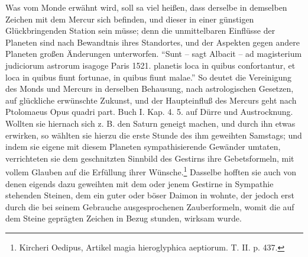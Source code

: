 \documentclass[a4paper, 11pt, oneside, polutonikogreek, german]{article}
\begin{document}
{\hspace*{0.5cm} Was vom Monde erwähnt wird, soll sa viel heißen, dass derselbe in demselben Zeichen mit dem Mercur sich befinden, und dieser in einer günstigen Glückbringenden Station sein müsse; denn die unmittelbaren Einflüsse der Planeten sind nach Bewandtnis ihres Standortes, und der Aspekten gegen andere Planeten großen Änderungen unterworfen. "`Sunt -- sagt Albacit -- ad magisterium judiciorum astrorum isagoge Paris 1521. planetis loca in quibus confortantur, et loca in quibus fiunt fortunae, in quibus fiunt malae."' So deutet die Vereinigung des Monds und Mercurs in derselben Behausung, nach astrologischen Gesetzen, auf glückliche erwünschte Zukunst, und der Haupteinfluß des Mercurs geht nach Ptolomaeus Opus quadri part. Buch I. Kap. 4. 5. auf Dürre und Austrocknung.} Wollten sie hiernach sich z. B. den Saturn geneigt machen, und durch ihn etwas erwirken, so wählten sie hierzu die erste Stunde des ihm geweihten Samstags; und indem sie eigene mit diesem Planeten sympathisierende Gewänder umtaten, verrichteten sie dem geschnitzten Sinnbild des Gestirns ihre Gebetsformeln, mit vollem Glauben auf die Erfüllung ihrer Wünsche.\footnote{Kircheri Oedipus, Artikel magia hieroglyphica aeptiorum. T. II. p. 437.} Dasselbe hofften sie auch von denen eigends dazu geweihten mit dem oder jenem Gestirne in Sympathie stehenden Steinen, dem ein guter oder böser Daimon in wohnte, der jedoch erst durch die bei seinem Gebrauche ausgesprochenen Zauberformeln, womit die auf dem Steine geprägten Zeichen in Bezug stunden, wirksam wurde.
\end{document}
